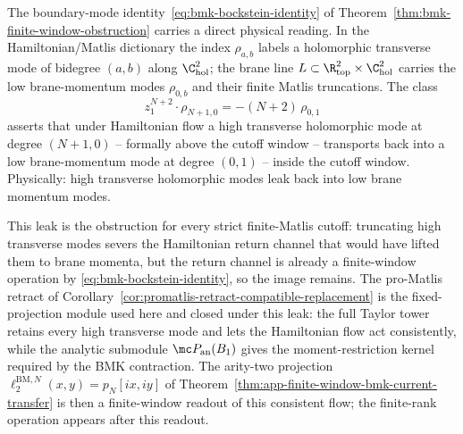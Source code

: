 \begin{rmk}\label{rmk:bmk-leak}
  The boundary-mode identity~\eqref{eq:bmk-bockstein-identity} of
  Theorem~\ref{thm:bmk-finite-window-obstruction} carries a direct physical
  reading.  In the Hamiltonian/Matlis dictionary the index
  \(\rho_{a,b}\) labels a holomorphic transverse mode of bidegree
  \((a,b)\) along \(\C^2_{\mathrm{hol}}\); the brane line
  \(L\subset\R^2_{\mathrm{top}}\times\C^2_{\mathrm{hol}}\) carries the
  low brane-momentum modes \(\rho_{0,b}\) and their finite Matlis
  truncations.  The class
  \[
    z_1^{N+2}\cdot\rho_{N+1,0}=-(N+2)\,\rho_{0,1}
  \]
  asserts that under Hamiltonian flow a high transverse holomorphic
  mode at degree \((N+1,0)\) -- formally above the cutoff window --
  transports back into a low brane-momentum mode at degree \((0,1)\)
  -- inside the cutoff window.  Physically: high transverse
  holomorphic modes leak back into low brane momentum modes.

  This leak is the obstruction for every strict finite-Matlis cutoff:
  truncating high transverse modes severs the Hamiltonian return
  channel that would have lifted them to brane momenta, but the
  return channel is already a finite-window operation by
  \eqref{eq:bmk-bockstein-identity}, so the image remains.  The
  pro-Matlis retract of
	  Corollary~\ref{cor:promatlis-retract-compatible-replacement} is the
	  fixed-projection module used here and closed under this leak: the full Taylor tower retains every
  high transverse mode and lets the Hamiltonian flow act
  consistently, while the analytic submodule
  \(\mc P_{\mathrm{an}}(B_1)\) gives the moment-restriction kernel
  required by the BMK contraction.  The arity-two projection
  \(\ell^{\mathrm{BM},N}_2(x,y)=p_N[ix,iy]\) of
  Theorem~\ref{thm:app-finite-window-bmk-current-transfer} is then a
  finite-window readout of this consistent flow; the finite-rank
  operation appears after this readout.
\end{rmk}

